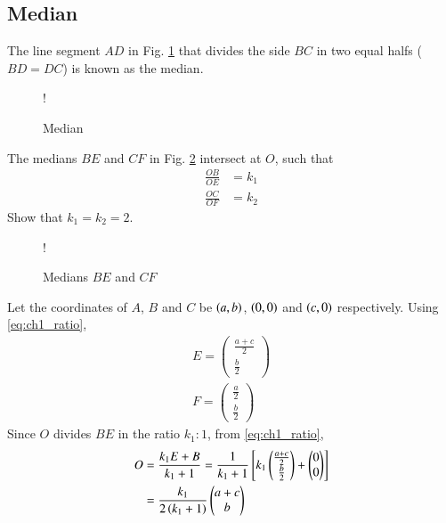 \subsection{Median}
\begin{definition}
	The line segment $AD$ in Fig. \ref{fig:ch1_median_def} that divides the side $BC$ in two equal halfs ($BD=DC$) is known as the median.
\end{definition}
%
\begin{figure}[!h]
\centering
\resizebox {\columnwidth} {!} {

}
\caption{Median}
\label{fig:ch1_median_def}
\end{figure}
%

\begin{problem}
The medians $BE$ and $CF$ in Fig. \ref{fig:ch1_two_median} intersect at $O$, such that
\begin{equation}
\begin{split}
\frac{OB}{OE} &= k_1
\\
\frac{OC}{OF} &= k_2
\end{split}
\end{equation}
Show that $k_1 = k_2 = 2$.
\end{problem}
%
\begin{figure}[!h]
\centering
\resizebox {\columnwidth} {!} {

}
\caption{Medians $BE$ and $CF$}
\label{fig:ch1_two_median}
\end{figure}
\proof
Let the coordinates of $A$, $B$ and $C$ be $\left(a,b\right)$, $\left(0,0\right)$ and $\left(c,0\right)$ respectively. Using \ref{eq:ch1_ratio}, 
%
\begin{align}
E = 
\begin{pmatrix}
\frac{a+c}{2}
\\
\frac{b}{2}
\end{pmatrix}
\\
F = 
\begin{pmatrix}
\frac{a}{2}
\\
\frac{b}{2}
\end{pmatrix}
\end{align}
%
Since $O$ divides $BE$ in the ratio $k_1:1$, from \eqref{eq:ch1_ratio},
\begin{align}
O &= \frac{k_1E+B}{k_1+1}
= \frac{1}{k_1+1}{}\left[k_1
\begin{pmatrix}
\frac{a+c}{2}
\\
\frac{b}{2}
\end{pmatrix}
+
\begin{pmatrix}
0
\\
0
\end{pmatrix}
\right]
\\
&= \frac{k_1}{2\left(k_1+1\right)}
\begin{pmatrix}
a+c
\\
b
\end{pmatrix}
\label{eq:ch1_ratio_1}
\end{align}
